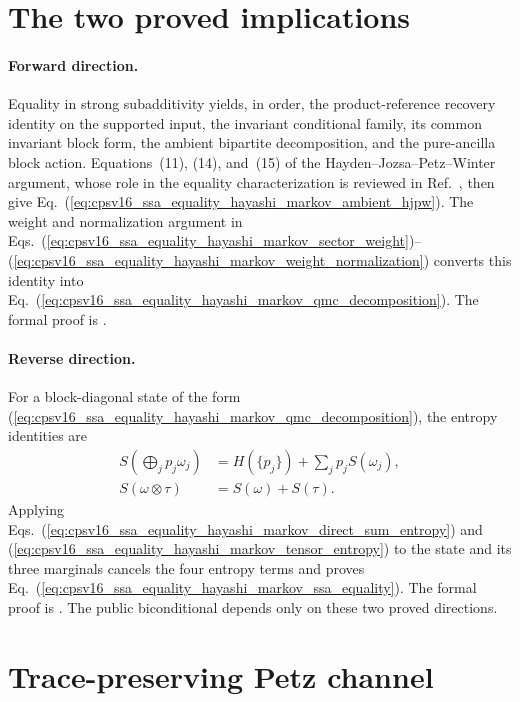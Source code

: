 \documentclass[11pt]{article}
\begin{document}
\section{The two proved implications}

\paragraph{Forward direction.}
Equality in strong subadditivity yields, in order, the product-reference
recovery identity on the supported input, the invariant conditional family,
its common invariant block form, the ambient bipartite decomposition, and the
pure-ancilla block action. Equations~(11), (14), and~(15) of the
Hayden--Jozsa--Petz--Winter argument, whose role in the equality
characterization is reviewed in Ref.~\cite{Cirac2021Matrix}, then give
Eq.~(\ref{eq:cpsv16_ssa_equality_hayashi_markov_ambient_hjpw}). The weight and
normalization argument in
Eqs.~(\ref{eq:cpsv16_ssa_equality_hayashi_markov_sector_weight})--%
(\ref{eq:cpsv16_ssa_equality_hayashi_markov_weight_normalization}) converts
this identity into
Eq.~(\ref{eq:cpsv16_ssa_equality_hayashi_markov_qmc_decomposition}). The formal
proof is .

\paragraph{Reverse direction.}
For a block-diagonal state of the form
(\ref{eq:cpsv16_ssa_equality_hayashi_markov_qmc_decomposition}), the entropy
identities are
\begin{align}
    S\!\left(\bigoplus_jp_j\omega_j\right)
        &=H(\{p_j\})+\sum_jp_jS(\omega_j),
    \label{eq:cpsv16_ssa_equality_hayashi_markov_direct_sum_entropy}\\
    S(\omega\otimes\tau)
        &=S(\omega)+S(\tau).
    \label{eq:cpsv16_ssa_equality_hayashi_markov_tensor_entropy}
\end{align}
Applying
Eqs.~(\ref{eq:cpsv16_ssa_equality_hayashi_markov_direct_sum_entropy}) and
(\ref{eq:cpsv16_ssa_equality_hayashi_markov_tensor_entropy}) to the state and
its three marginals cancels the four entropy terms and proves
Eq.~(\ref{eq:cpsv16_ssa_equality_hayashi_markov_ssa_equality}). The formal
proof is . The public
biconditional  depends only on
these two proved directions.

\section{Trace-preserving Petz channel}
\end{document}
